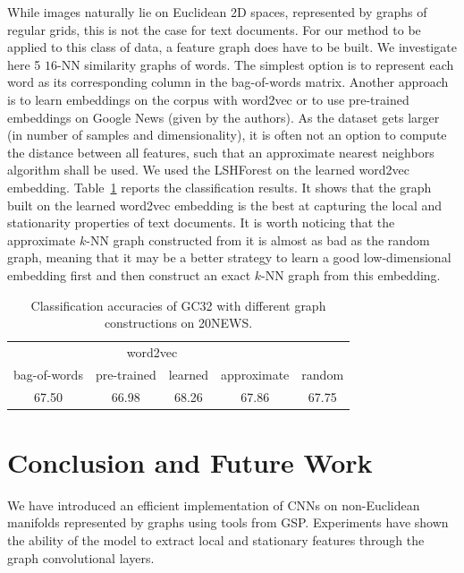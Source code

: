 \documentclass{article}
\newcommand{\tabref}[1]{Table~\ref{tab:#1}}
\newcommand{\todo}[1]{{\color{red} #1 }}
\begin{document}
While images naturally lie on Euclidean 2D spaces, represented by graphs of regular grids, this is not the case for
text documents. For our method to be applied to this class of data, a feature graph does have to be built.
We investigate here 5 $16$-NN similarity graphs of words. The simplest option is
to represent each word as its corresponding column in the bag-of-words matrix.
Another approach is to learn embeddings on the corpus with word2vec
\cite{pro:MikolovChenCorradoDean13word2vec} or to use pre-trained embeddings on
Google News (given by the authors). As the dataset gets larger (in number of
samples and dimensionality), it is often not an option to compute the distance
between all features, such that an approximate nearest neighbors algorithm shall
be used. We used the LSHForest \cite{pro:BawaCondieGanesan05LSHForest} on the
learned word2vec embedding. \tabref{20news_quality} reports the classification
results. It shows that the graph built on the learned word2vec embedding is the
best at capturing the local and stationarity properties of text documents. It is
worth noticing that the approximate $k$-NN graph constructed from it is almost
as bad as the random graph, meaning that it may be a better strategy to learn a
good low-dimensional embedding first and then construct an exact $k$-NN graph
from this embedding.

\begin{table}[h!] \centering
\vspace{0.5cm}
\begin{tabular}{ccccc} \toprule
& \multicolumn{2}{c}{word2vec} & & \\
bag-of-words & pre-trained & learned & approximate & random \\
\midrule
67.50 & \todo{66.98} & 68.26 & 67.86 & 67.75 \\
\bottomrule \end{tabular}
\caption{Classification accuracies of GC32 with different graph constructions on 20NEWS.} 
\label{tab4b}
\label{tab:20news_quality}
\end{table}










\section{Conclusion and Future Work}

We have introduced an efficient implementation of CNNs on non-Euclidean
manifolds represented by graphs using tools from GSP. Experiments have shown the
ability of the model to extract local and stationary features through the graph
convolutional layers. 
\end{document}
